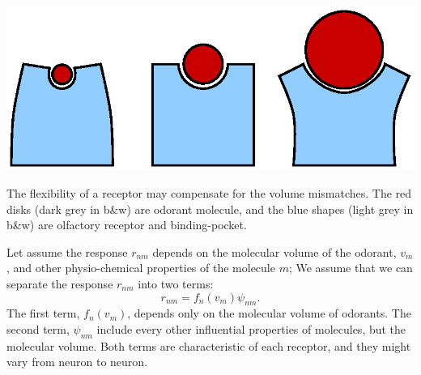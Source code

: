 \documentclass[a1paper,fontscale=0.6]{baposter} %
\begin{document}
\begin{poster}
{\begin{center}
\includegraphics[width=0.75 \textwidth]{fig/binding-pocket-flex}
\end{center}

The flexibility of a receptor may compensate for the volume mismatches. 
The red disks (dark grey in b\&w) are odorant molecule, 
and the blue shapes (light grey in b\&w) are olfactory receptor and binding-pocket.


Let assume the response $r_{nm}$ depends on the molecular volume of the odorant, $v_m$, 
and other physio-chemical properties of the molecule $m$; 
We assume that we can separate the response $r_{nm}$ into two terms:
{\huge
\begin{equation}
	r_{nm} = f_n(v_m) \psi_{nm}.
	\label{eqn:factors}
\end{equation}
}
The first term, $f_n(v_m)$, depends only on the molecular volume of odorants.
The second term, $\psi_{nm}$ include every other influential properties of molecules, but the molecular volume.
Both terms are characteristic of each receptor, and they might vary from neuron to neuron.
}




\end{poster}
\end{document}
